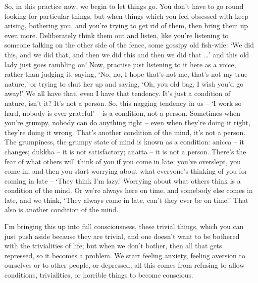 So, in this practice now, we begin to let things go. You don't have to go round looking for particular things, but when things which you feel obsessed with keep arising, bothering you, and you're trying to get rid of them, then bring them up even more. Deliberately think them out and listen, like you're listening to someone talking on the other side of the fence, some gossipy old fish-wife: `We did this, and we did that, and then we did this and then we did that \ldots{}' and this old lady just goes rambling on! Now, practise just listening to it here as a voice, rather than judging it, saying, `No, no, I hope that's not me, that's not my true nature,' or trying to shut her up and saying, `Oh, you old bag, I wish you'd go away!' We all have that, even I have that tendency. It's just a condition of nature, isn't it? It's not a person. So, this nagging tendency in us -- `I work so hard, nobody is ever grateful' -- is a condition, not a person. Sometimes when you're grumpy, nobody can do anything right -- even when they're doing it right, they're doing it wrong. That's another condition of the mind, it's not a person. The grumpiness, the grumpy state of mind is known as a condition: anicca -- it changes; dukkha -- it is not satisfactory; anatta -- it is not a person. There's the fear of what others will think of you if you come in late: you've overslept, you come in, and then you start worrying about what everyone's thinking of you for coming in late -- `They think I'm lazy.' Worrying about what others think is a condition of the mind. Or we're always here on time, and somebody else comes in late, and we think, `They always come in late, can't they ever be on time!' That also is another condition of the mind.

I'm bringing this up into full consciousness, these trivial things, which you can just push aside because they are trivial, and one doesn't want to be bothered with the trivialities of life; but when we don't bother, then all that gets repressed, so it becomes a problem. We start feeling anxiety, feeling aversion to ourselves or to other people, or depressed; all this comes from refusing to allow conditions, trivialities, or horrible things to become conscious.

